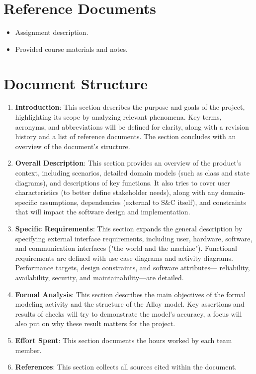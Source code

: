 \section{Reference Documents}
\label{sec:reference-documents}%

\begin{itemize}
    \item Assignment description.
    \item Provided course materials and notes.
\end{itemize}

\section{Document Structure}
\label{sec:document-structure}%

\begin{enumerate}
    \item \textbf{Introduction}: This section describes the purpose and goals of the project, highlighting its scope by
          analyzing relevant phenomena. Key terms, acronyms, and abbreviations will be defined for clarity, along with a
          revision history and a list of reference documents. The section concludes with an overview of the document’s
          structure.
    \item \textbf{Overall Description}: This section provides an overview of the product’s context, including
          scenarios, detailed domain models (such as class and state diagrams), and descriptions of key functions. It also
          tries to cover user characteristics (to better define stakeholder needs), along with any domain-specific
          assumptions, dependencies (external to S\&C itself), and constraints that will impact the software design and
          implementation.
    \item \textbf{Specific Requirements}: This section expands the general description by specifying external interface
          requirements, including user, hardware, software, and communication interfaces ("the world and the machine").
          Functional requirements are defined with use case diagrams and activity diagrams. Performance targets, design
          constraints, and software attributes— reliability, availability, security, and maintainability—are detailed.
    \item \textbf{Formal Analysis}: This section describes the main objectives of the formal modeling activity and the
          structure of the Alloy model. Key assertions and results of checks will try to demonstrate the model’s accuracy, a
          focus will also put on why these result matters for the project.
    \item \textbf{Effort Spent}: This section documents the hours worked by each team member.
    \item \textbf{References}: This section collects all sources cited within the document.
\end{enumerate}
